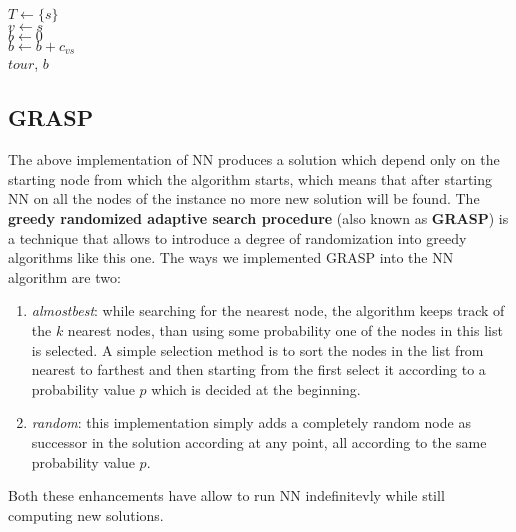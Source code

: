\begin{algorithm}[H]
    \BlankLine
    $T \gets \{s\}$\\
    $v \gets s$\\
    $b \gets 0$\\
    $b \gets b + c_{vs}$\\
    \Return $tour$, $b$\\
\end{algorithm}

\subsection{GRASP}
The above implementation of NN produces a solution which depend only on the starting node from which the algorithm starts, which means that after starting NN on all the nodes of the instance no more new solution will be found.
The \textbf{greedy randomized adaptive search procedure} (also known as \textbf{GRASP}) is a technique that allows to introduce a degree of randomization into greedy algorithms like this one.
The ways we implemented GRASP into the NN algorithm are two:
\begin{enumerate}
    \item \textit{almostbest}: 
    while searching for the nearest node, the algorithm keeps track of the $k$ nearest nodes, than using some probability one of the nodes in this list is selected.
    A simple selection method is to sort the nodes in the list from nearest to farthest and then starting from the first select it according to a probability value $p$ which is decided at the beginning.
    \item \textit{random}:
    this implementation simply adds a completely random node as successor in the solution according at any point, all according to the same probability value $p$.
\end{enumerate}
Both these enhancements have allow to run NN indefinitevly while still computing new solutions.

